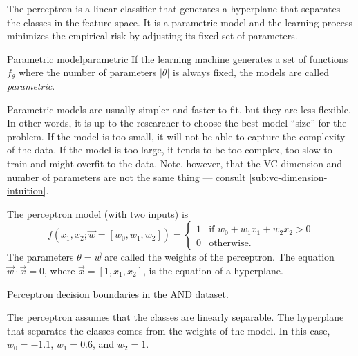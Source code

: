 The perceptron is a linear classifier that generates a hyperplane that separates the
classes in the feature space.  It is a parametric model and the learning process minimizes the empirical risk
by adjusting its fixed set of parameters.

\begin{defbox}{Parametric model}{parametric}
  If the learning machine generates a set of functions $f_\theta$ where the number of
  parameters $|\theta|$ is always fixed, the models are called \emph{parametric}.
\end{defbox}

Parametric models are usually simpler and faster to fit, but they are less flexible.  In
other words, it is up to the researcher to choose the best model ``size'' for the problem.
If the model is too small, it will not be able to capture the complexity of the data.  If
the model is too large, it tends to be too complex, too slow to train and might overfit to
the data.  Note, however, that the VC dimension and number of parameters are not the same
thing --- consult \cref{sub:vc-dimension-intuition}.

The perceptron model (with two inputs) is
\begin{equation*}
  f(x_1, x_2; \vec{w} = \left[w_0, w_1, w_2\right]) =  \begin{cases}
    1 & \text{if } w_0 + w_1 x_1 + w_2 x_2 > 0 \\
    0 & \text{otherwise.}
  \end{cases}
\end{equation*}
The parameters $\theta = \vec{w}$ are called the weights of the perceptron.
The equation $\vec{w} \cdot \vec{x} = 0$, where $\vec{x} = [1, x_1,
x_2]$, is the equation of a hyperplane.

\begin{figurebox}[label=fig:perceptron-and]{Perceptron decision boundaries in the AND dataset.}
  \centering
  \tcblower
  The perceptron assumes that the classes are linearly separable.
  The hyperplane that separates the classes comes from the weights of the model.
  In this case, $w_0 = -1.1$, $w_1 = 0.6$, and $w_2 = 1$.
\end{figurebox}

